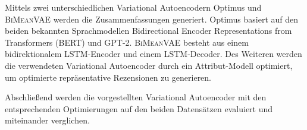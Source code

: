 Mittels zwei unterschiedlichen Variational Autoencodern Optimus und \textsc{BiMeanVAE} werden die Zusammenfassungen generiert.
Optimus basiert auf den beiden bekannten Sprachmodellen Bidirectional Encoder Representations from Transformers (BERT) und GPT-2. 
\textsc{BiMeanVAE} besteht aus einem bidirektionalem LSTM-Encoder und einem LSTM-Decoder.
Des Weiteren werden die verwendeten Variational Autoencoder durch ein Attribut-Modell optimiert, um optimierte repräsentative Rezensionen zu generieren.

Abschließend werden die vorgestellten Variational Autoencoder mit den entsprechenden Optimierungen auf den beiden Datensätzen evaluiert und miteinander verglichen.












